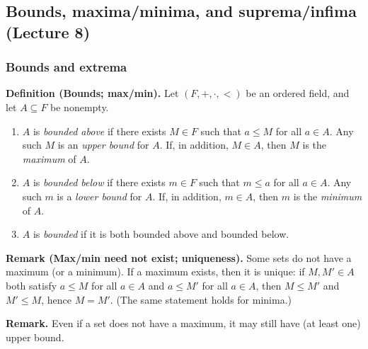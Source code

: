 \documentclass[12pt]{article}
\begin{document}
\subsection*{Bounds, maxima/minima, and suprema/infima (Lecture 8)}

\subsubsection*{Bounds and extrema}
\textbf{Definition (Bounds; max/min).}
Let $(F,+,\cdot,<)$ be an ordered field, and let $A\subseteq F$ be nonempty.
\begin{enumerate}[label=\textbf{(B\arabic*)}, leftmargin=3em, itemsep=0.25em]
\item $A$ is \emph{bounded above} if there exists $M\in F$ such that $a\le M$ for all $a\in A$. Any such $M$ is an \emph{upper bound} for $A$. If, in addition, $M\in A$, then $M$ is the \emph{maximum} of $A$.
\item $A$ is \emph{bounded below} if there exists $m\in F$ such that $m\le a$ for all $a\in A$. Any such $m$ is a \emph{lower bound} for $A$. If, in addition, $m\in A$, then $m$ is the \emph{minimum} of $A$.
\item $A$ is \emph{bounded} if it is both bounded above and bounded below.
\end{enumerate}

\textbf{Remark (Max/min need not exist; uniqueness).}
Some sets do not have a maximum (or a minimum). If a maximum exists, then it is unique: if $M,M'\in A$ both satisfy
$a\le M$ for all $a\in A$ and $a\le M'$ for all $a\in A$, then $M\le M'$ and $M'\le M$, hence $M=M'$.
(The same statement holds for minima.)

\textbf{Remark.}
Even if a set does not have a maximum, it may still have (at least one) upper bound.
\end{document}
